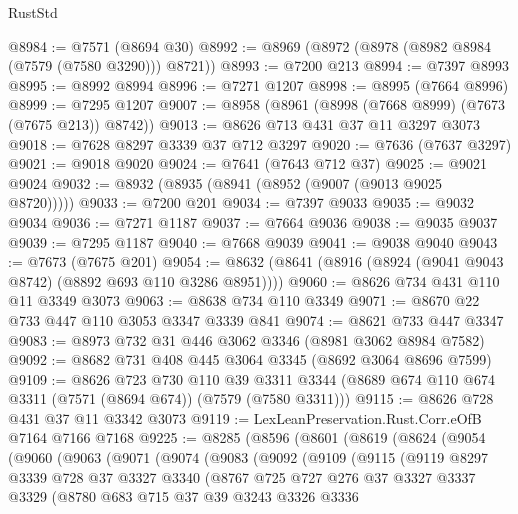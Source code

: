 \begin{lexlean}{RustStd}
\begin{coremodule}
@8984 := @7571 (@8694 @30)
@8992 := @8969 (@8972 (@8978 (@8982 @8984 (@7579 (@7580 @3290))) @8721))
@8993 := @7200 @213
@8994 := @7397 @8993
@8995 := @8992 @8994
@8996 := @7271 @1207
@8998 := @8995 (@7664 @8996)
@8999 := @7295 @1207
@9007 := @8958 (@8961 (@8998 (@7668 @8999) (@7673 (@7675 @213)) @8742))
@9013 := @8626 @713 @431 @37 @11 @3297 @3073
@9018 := @7628 @8297 @3339 @37 @712 @3297
@9020 := @7636 (@7637 @3297)
@9021 := @9018 @9020
@9024 := @7641 (@7643 @712 @37)
@9025 := @9021 @9024
@9032 := @8932 (@8935 (@8941 (@8952 (@9007 (@9013 @9025 @8720)))))
@9033 := @7200 @201
@9034 := @7397 @9033
@9035 := @9032 @9034
@9036 := @7271 @1187
@9037 := @7664 @9036
@9038 := @9035 @9037
@9039 := @7295 @1187
@9040 := @7668 @9039
@9041 := @9038 @9040
@9043 := @7673 (@7675 @201)
@9054 := @8632 (@8641 (@8916 (@8924 (@9041 @9043 @8742) (@8892 @693 @110 @3286 @8951))))
@9060 := @8626 @734 @431 @110 @11 @3349 @3073
@9063 := @8638 @734 @110 @3349
@9071 := @8670 @22 @733 @447 @110 @3053 @3347 @3339 @841
@9074 := @8621 @733 @447 @3347
@9083 := @8973 @732 @31 @446 @3062 @3346 (@8981 @3062 @8984 @7582)
@9092 := @8682 @731 @408 @445 @3064 @3345 (@8692 @3064 @8696 @7599)
@9109 := @8626
    @723
    @730
    @110
    @39
    @3311
    @3344
    (@8689 @674 @110 @674 @3311 (@7571 (@8694 @674)) (@7579 (@7580 @3311)))
@9115 := @8626 @728 @431 @37 @11 @3342 @3073
@9119 := LexLeanPreservation.Rust.Corr.eOfB @7164 @7166 @7168
@9225 := @8285
    (@8596
      (@8601
        (@8619
          (@8624
            (@9054
              (@9060
                (@9063
                  (@9071
                    (@9074
                      (@9083
                        (@9092
                          (@9109
                            (@9115
                              (@9119
                                @8297
                                @3339
                                @728
                                @37
                                @3327
                                @3340
                                (@8767
                                  @725
                                  @727
                                  @276
                                  @37
                                  @3327
                                  @3337
                                  @3329
                                  (@8780
                                    @683
                                    @715
                                    @37
                                    @39
                                    @3243
                                    @3326
                                    @3336

\end{coremodule}
\end{lexlean}
